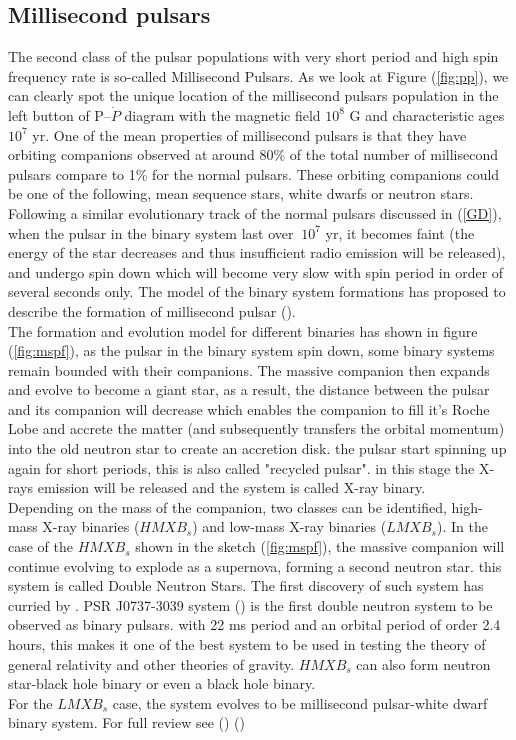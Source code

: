 \subsection{Millisecond pulsars}
\label{MSP}
The second class of the pulsar populations with very short period and high spin frequency rate is so-called Millisecond Pulsars. As we look at Figure (\ref{fig:pp}), we can clearly spot the unique location of the millisecond pulsars population in the left button of P--$\dot{P}$ diagram with the magnetic field $10^{8}$ G and characteristic ages $10^{7}$  yr. One of the mean properties of millisecond pulsars is that they have orbiting companions observed at around 80\% of the total number of millisecond pulsars compare to 1\% for the normal pulsars. These orbiting companions could be one of the following, mean sequence stars, white dwarfs or neutron stars.\\
Following a similar evolutionary track of the normal pulsars discussed in (\cref{GD}), when the pulsar in the binary system last over $~10^{7}$ yr, it becomes faint (the energy of the star decreases and thus insufficient radio emission will be released), and undergo spin down which will become very slow with spin period in order of several seconds only. The model of the binary system formations has proposed to describe the formation of millisecond pulsar (\citet{alpar1982new}).\\
The formation and evolution model for different binaries has shown in figure (\ref{fig:mspf}), as the pulsar in the binary system spin down, some binary systems remain bounded with their companions. The massive companion then expands and evolve to become a giant star, as a result, the distance between the pulsar and its companion will decrease which enables the companion to fill it's Roche Lobe and accrete the matter (and subsequently transfers the orbital momentum) into the old neutron star to create an accretion disk. the pulsar start spinning up again for short periods, this is also called "recycled pulsar". in this stage the X-rays emission will be released and the system is called X-ray binary.\\
Depending on the mass of the companion, two classes can be identified, high-mass X-ray binaries ($HMXB_{s}$) and low-mass X-ray binaries ($LMXB_{s}$). In the case of the $HMXB_{s}$ shown in the sketch (\ref{fig:mspf}), the massive companion will continue evolving to explode as a supernova, forming a second neutron star. this system is called Double Neutron Stars. The first discovery of such system has curried by \citet{taylor1982new}. PSR J0737-3039 system (\citet{burgay2003increased}) is the first double neutron system to be observed as binary pulsars. with 22 ms period and an orbital period of order 2.4 hours, this makes it one of the best system to be used in testing the theory of general relativity and other theories of gravity. $HMXB_{s}$ can also form neutron star-black hole binary or even a black hole binary.\\
For the $LMXB_{s}$ case, the system evolves to be millisecond pulsar-white dwarf binary system.
For full review see (\citet{Lorimer2001})  
(\citet{backer1982millisecond})

